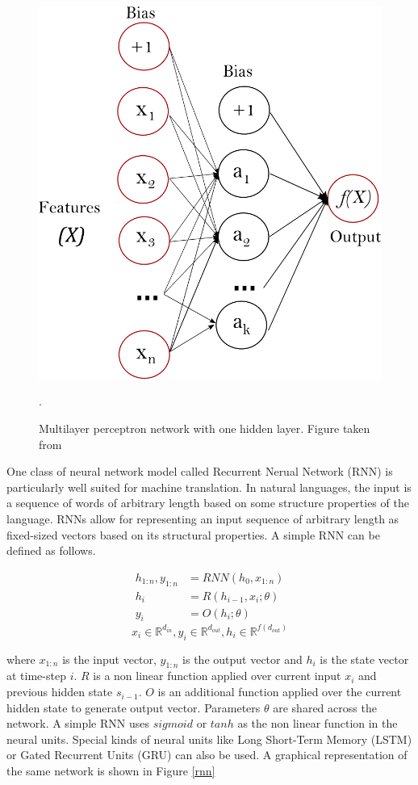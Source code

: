 \begin{figure}[ht]
	\centering
	\includegraphics{images/multilayerperceptron_network}
	\caption{Multilayer perceptron network with one hidden layer. Figure taken from  \cite{pedregosa2011scikit}}
	\label{mlp}.
\end{figure}

One class of neural network model called Recurrent Nerual Network (RNN) \citep{elman1990finding} is particularly well suited for machine translation. In natural languages, the input is a sequence of words of arbitrary length based on some structure properties of the language. RNNs allow for representing an input sequence of arbitrary length as fixed-sized vectors based on its structural properties. A simple RNN \citep{goldberg2016primer} can be defined as follows.

\begin{align}
h_{1:n},  y_{1:n} &= RNN(h_0,x_{1:n}) \\
h_i &= R(h_{i-1},x_i;\theta) \\
y_i &= O(h_i;\theta)
\end{align}
\[ 
x_i \in \mathbb{R}^{d_{in}}, y_i \in \mathbb{R}^{d_{out}}, h_i \in \mathbb{R}^{f({d_{out}})} \]

where $x_{1:n}$ is the input vector, $y_{1:n}$ is the output vector and $h_{i}$ is the state vector at time-step $i$. $R$ is a non linear function applied over current input $x_i$ and previous hidden state $s_{i-1}$. $O$ is an additional function applied over the current hidden state to generate output vector.  Parameters $\theta$ are shared across the network. A simple RNN uses $sigmoid$ or $tanh$ as the non linear function in the neural units. Special kinds of neural units like Long Short-Term Memory (LSTM) \citep{hochreiter1997long} or Gated Recurrent Units (GRU) \citep{cho2014learning} can also be used. A graphical representation of the same network is shown in Figure \ref{rnn}


